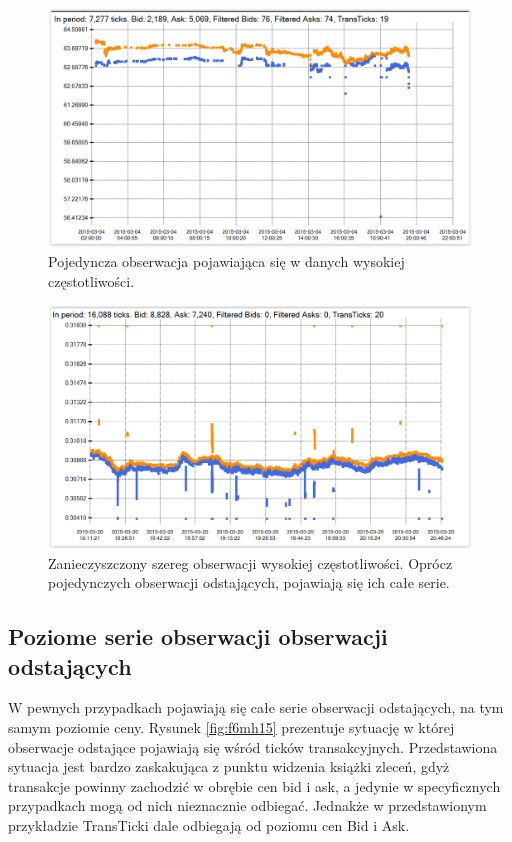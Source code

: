 \documentclass[a4paper,12pt,openany, DIV=calc, headsepline]{scrbook}
\begin{document}
\begin{figure}[H]
  \centering
  \includegraphics[scale=0.5]{wykresy/singleCT.PNG}
  \caption{Pojedyncza obserwacja pojawiająca się w danych wysokiej częstotliwości.}
  \label{fig:singleCT}
\end{figure}

\begin{figure}[H]
  \centering
  \includegraphics[scale=0.5]{wykresy/f6LJ15.PNG}
  \caption{Zanieczyszczony szereg obserwacji wysokiej częstotliwości. Oprócz pojedynczych obserwacji odstających, pojawiają się ich całe serie.}
  \label{fig:f6LJ15}
\end{figure}

\subsection{Poziome serie obserwacji obserwacji odstających}

W pewnych przypadkach pojawiają się całe serie obserwacji odstających, na tym samym poziomie ceny. Rysunek \ref{fig:f6mh15} prezentuje sytuację w której obserwacje odstające pojawiają się wśród ticków transakcyjnych. Przedstawiona sytuacja jest bardzo zaskakująca z punktu widzenia książki zleceń, gdyż transakcje powinny zachodzić w obrębie cen bid i ask, a jedynie w specyficznych przypadkach mogą od nich nieznacznie odbiegać. Jednakże w przedstawionym przykładzie TransTicki dale odbiegają od poziomu cen Bid i Ask.
\end{document}
